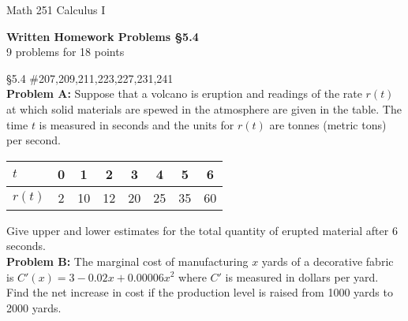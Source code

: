 \documentclass[11pt]{report}
\theoremstyle{plain}
\begin{document}
\hfill Math 251 Calculus I
\begin{center}
\Large{\textbf{Written Homework Problems \S 5.4}} \\
9 problems for 18 points\\
\end{center}

\begin{description}
\item{\S 5.4} \#207,209,211,223,227,231,241\\

\textbf{Problem A:} Suppose that a volcano is eruption and readings of the rate $r(t)$ at which solid materials are spewed in the atmosphere are given in the table. The time $t$ is measured in seconds and the units for $r(t)$ are tonnes (metric tons) per second.\\

\begin{tabular}{l | c|c|c|c|c|c|c}
$t$&0&1&2&3&4&5&6\\
\hline
$r(t)$&2&10&12&20&25&35&60\\
\end{tabular}

Give upper and lower estimates for the total quantity of erupted material after 6 seconds.\\


\textbf{Problem B:} The marginal cost of manufacturing $x$ yards of a decorative fabric is $C'(x) = 3-0.02x+0.00006x^2$ where $C'$ is measured in dollars per yard. Find the net increase in cost if the production level is raised from 1000 yards to 2000 yards.

\end{description}
\end{document}
